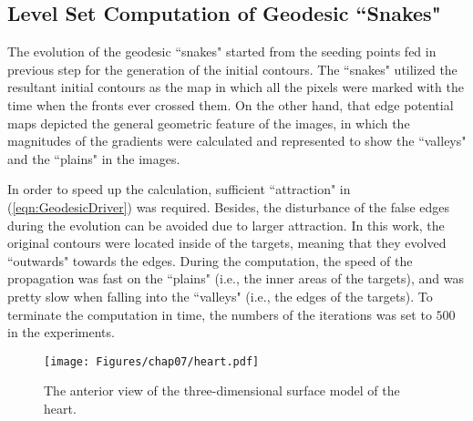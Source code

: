 \subsection{Level Set Computation of Geodesic ``Snakes"}

The evolution of the geodesic ``snakes" started from the seeding points fed in previous step for the generation of the initial contours.
The ``snakes" utilized the resultant initial contours as the map in which all the pixels were marked with the time when the fronts ever crossed them.
On the other hand, that edge potential maps depicted the general geometric feature of the images, in which the magnitudes of the gradients were calculated and represented to show the ``valleys" and the ``plains" in the images. %

In order to speed up the calculation, sufficient ``attraction" in (\ref{eqn:GeodesicDriver}) was required.
Besides, the disturbance of the false edges during the evolution can be avoided due to larger attraction.
In this work, the original contours were located inside of the targets, meaning that they evolved ``outwards" towards the edges.
During the computation, the speed of the propagation was fast on the ``plains" (i.e., the inner areas of the targets), and was pretty slow when falling into the ``valleys" (i.e., the edges of the targets). %
To terminate the computation in time, the numbers of the iterations was set to $500$ in the experiments.
\begin{figure}[t]
\centering
\texttt{[image: Figures/chap07/heart.pdf]}
\caption{The anterior view of the three-dimensional surface model of the heart.}
\label{fig:Heart}
\end{figure}
